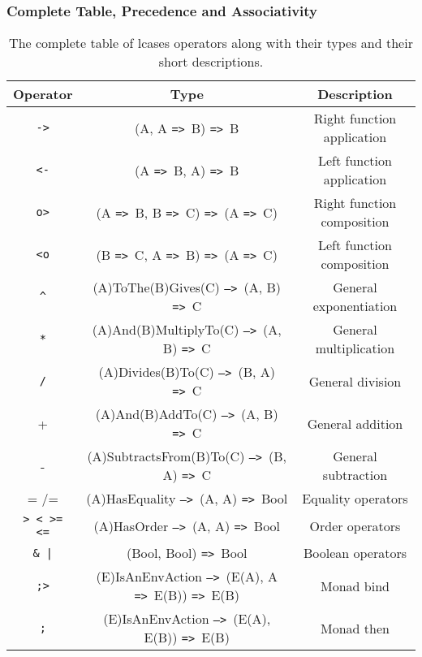 \documentclass{article}
\def\ra{\texttt{=>}\ }
\def\Ra{\texttt{-->}\ }
\begin{document}
\subsubsection{Complete Table, Precedence and Associativity}
\begin{table}[h!]

\caption{
The complete table of lcases operators along with their types and 
their short descriptions.
}

\begin{center}
\begin{tabular}{ |c|c|c| } 
\hline
Operator & Type & Description \\ 
\hline
\hline
\texttt{->} & (A, A \ra B) \ra B & Right function application \\
\hline
\texttt{<-} & (A \ra B, A) \ra B & Left function application \\
\hline
\texttt{o>} & (A \ra B, B \ra C) \ra (A \ra C) & Right function composition \\
\hline
\texttt{<o} & (B \ra C, A \ra B) \ra (A \ra C) & Left function composition \\
\hline
\texttt{\^} & (A)ToThe(B)Gives(C) \Ra (A, B) \ra C & General exponentiation  \\
\hline
\texttt{*} & (A)And(B)MultiplyTo(C) \Ra (A, B) \ra C & General multiplication  \\
\hline
\texttt{/} & (A)Divides(B)To(C) \Ra (B, A) \ra C & General division \\
\hline
+ & (A)And(B)AddTo(C) \Ra (A, B) \ra C & General addition \\ 
\hline
- & (A)SubtractsFrom(B)To(C) \Ra (B, A) \ra C & General subtraction \\
\hline
= /= & (A)HasEquality \Ra (A, A) \ra Bool & Equality operators \\
\hline
\texttt{> < >= <=} & (A)HasOrder \Ra (A, A) \ra Bool & Order operators \\
\hline
\texttt{\& |} & (Bool, Bool) \ra Bool & Boolean operators \\
\hline
\texttt{;>} & (E)IsAnEnvAction \Ra (E(A), A \ra E(B)) \ra E(B) &
Monad bind \\
\hline
\texttt{;} & (E)IsAnEnvAction \Ra (E(A), E(B)) \ra E(B) &
Monad then \\
\hline
\end{tabular}
\end{center}

\label{table:allops}

\end{table}\mbox{}\\
\end{document}
